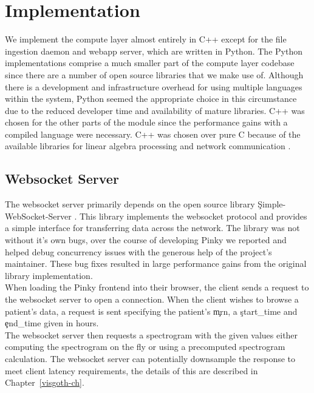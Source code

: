 \section{Implementation}

We implement the compute layer almost entirely in C++ except for the file
ingestion daemon and webapp server, which are written in Python. The Python
implementations comprise a much smaller part of the compute layer codebase
since there are a number of open source libraries that we make use of. Although
there is a development and infrastructure overhead for using multiple languages
within the system, Python seemed the appropriate choice in this circumstance
due to the reduced developer time and availability of mature libraries. C++ was
chosen for the other parts of the module since the performance gains with a
compiled language were necessary. C++ was chosen over pure C because of the
available libraries for linear algebra processing \cite{arma} and network
communication \cite{websocket-server}.

\subsection{Websocket Server}\label{compute-ch:implementation-ws-server}

The websocket server primarily depends on the open source library
\c{Simple-WebSocket-Server} \cite{websocket-server}. This library implements
the websocket protocol and provides a simple interface for transferring data
across the network. The library was not without it's own bugs, over the course
of developing Pinky we reported and helped debug concurrency issues with the
generous help of the project's maintainer. These bug fixes resulted in large
performance gains from the original library implementation. \\

When loading the Pinky frontend into their browser, the client sends a request
to the websocket server to open a connection. When the client wishes to browse
a patient's data, a request is sent specifying the patient's \c{mrn}, a
\c{start\_time} and \c{end\_time} given in hours. \\

The websocket server then requests a spectrogram with the given values either
computing the spectrogram on the fly or using a precomputed spectrogram
calculation. The websocket server can potentially downsample the response to
meet client latency requirements, the details of this are described in
Chapter~\ref{visgoth-ch}. \\

